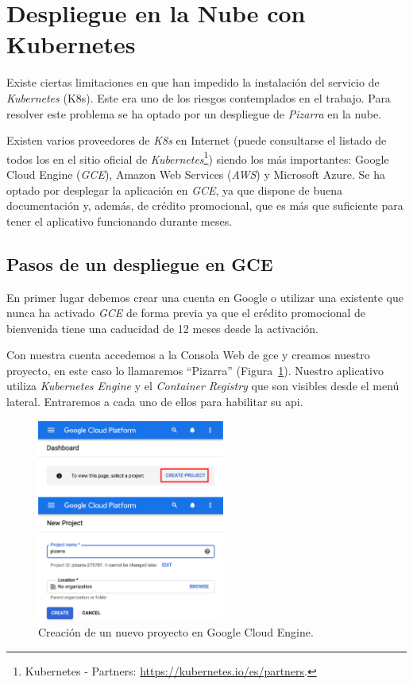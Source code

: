 \documentclass[11pt,spanish,listoffigures,listoftables]{tfgetsinf}
\begin{document}
\section{Despliegue en la Nube con Kubernetes}

Existe ciertas limitaciones en  \kahan que han impedido la instalación del servicio de \textit{Kubernetes} (K8s). Este era uno de los riesgos contemplados en el trabajo. Para resolver este problema se ha optado por un despliegue de \textit{Pizarra} en la nube. 

Existen varios proveedores de \textit{K8s} en Internet (puede consultarse el listado de todos los  en el sitio oficial de \textit{Kubernetes}\footnote{Kubernetes - Partners: \url{https://kubernetes.io/es/partners}.}) siendo los más importantes: Google Cloud Engine (\textit{GCE}), Amazon Web Services (\textit{AWS}) y Microsoft Azure. Se ha optado por desplegar la aplicación en \textit{GCE}, ya que dispone de buena documentación y, además,  de crédito promocional, que es más que suficiente para tener el aplicativo funcionando durante meses.

\subsection{Pasos de un despliegue en GCE}

En primer lugar debemos crear una cuenta en Google o utilizar una existente que nunca ha activado \textit{GCE} de forma previa ya que el crédito promocional de bienvenida tiene una caducidad de 12 meses desde la activación.

Con nuestra cuenta accedemos a la Consola Web de \acrshort{gce} y creamos nuestro proyecto, en este caso lo llamaremos ``Pizarra'' (Figura~\ref{figura:gce-new-project}). Nuestro aplicativo utiliza \textit{Kubernetes Engine} y el \textit{Container Registry} que son visibles desde el menú lateral. Entraremos a cada uno de ellos para habilitar su \acrshort{api}.

\begin{figure}[ht]
	\centering
	\includegraphics[width=0.55\textwidth]{img/gce-new-project}
	\caption[nuevo proyecto en GCE]{Creación de un nuevo proyecto en Google Cloud Engine.}
	\label{figura:gce-new-project}
\end{figure}
\end{document}
